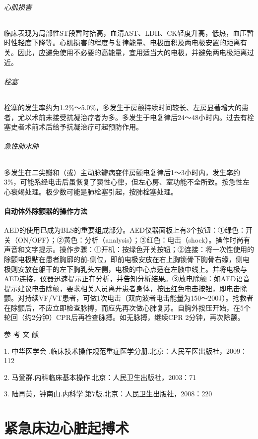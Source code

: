\subparagraph{心肌损害}

临床表现为局部性ST段暂时抬高，血清AST、LDH、CK轻度升高，低热，血压暂时性轻度下降等。心肌损害的程度与复律能量、电极面积及两电极安置的距离有关。因此，应避免使用不必要的高能量，宜用适当大的电极，并避免两电极距离过近。

\subparagraph{栓塞}

栓塞的发生率约为1.2\%～5.0\%，多发生于房颤持续时间较长、左房显著增大的患者，尤以术前未接受抗凝治疗者为多。多发生于电复律后24～48小时内。过去有栓塞史者术前术后给予抗凝治疗可起预防作用。

\subparagraph{急性肺水肿}

多发生在二尖瓣和（或）主动脉瓣病变伴房颤电复律后1～3小时内，发生率约3\%，可能系经电击后虽恢复了窦性心律，但左心房、室功能不全所致。按急性左心衰竭处理。极少数可能是肺栓塞引起，按肺栓塞处理。

\subsubsection{自动体外除颤器的操作方法}

AED的使用已成为BLS的重要组成部分。AED仪器面板上有3个按钮：①绿色：开关（ON/OFF）；②黄色：分析（analysis）；③红色：电击（shock）。操作时尚有声音和文字提示。操作步骤：①开机：按绿色开关按钮；②连接：将一次性使用的除颤电极贴在患者胸廓的前-侧位，即前电极安放在右上胸锁骨下胸骨右缘，侧电极则安放在躯干的左下胸乳头左侧，电极的中心点适在左腋中线上。并将电极与AED连接，仪器迅速提示正在分析，并告知分析结果。③放电除颤：如AED语音提示建议电击除颤，要求相关人员离开患者身体，按压红色电击按钮，即电击除颤。对持续VF/VT患者，可做1次电击（双向波者电击能量为150～200J）。抢救者在除颤后，不应立即检查脉搏，而应先再次做心肺复苏。自胸外按压开始，在5个轮回（约2分钟）CPR后再检查脉搏。如无脉搏，继续CPR
2分钟，再次除颤。

\protect\hypertarget{text00374.html}{}{}

\hypertarget{text00374.htmlux5cux23CHP16-4-7}{}
参 考 文 献

1. 中华医学会
.临床技术操作规范重症医学分册.北京：人民军医出版社，2009：112

2. 马爱群.内科临床基本操作.北京：人民卫生出版社，2003：71

3. 陆再英，钟南山.内科学.第7版.北京：人民卫生出版社，2008：220

\protect\hypertarget{text00375.html}{}{}

\chapter{紧急床边心脏起搏术}

